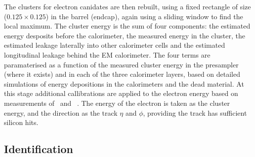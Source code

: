 The clusters for electron canidates are then rebuilt, using a fixed rectangle of size 
 ($0.125 \times 0.125$) in the barrel (endcap),
again using a sliding window to find the local maximum. The cluster energy is
the sum of four components: the estimated energy desposits before the
calorimeter, the measured energy in the cluster, the estimated leakage laterally
into other calorimeter cells and the estimated longitudinal leakage behind the
EM calorimeter. The four terms are paramaterised as a function of the measured
cluster energy in the presampler (where it exists) and in each of the three
calorimeter layers, based on detailed simulations of energy depositions in the
calorimeters and the dead material. At this stage additional callibrations are
applied to the electron energy based on measurements of \Zee\ and
\JPsiee~\cite{Aad:2011mk}. The energy of the electron is taken as the cluster
energy, and the direction as the track $\eta$ and $\phi$, providing the track
has sufficient silicon hits.

\subsection{Identification}

